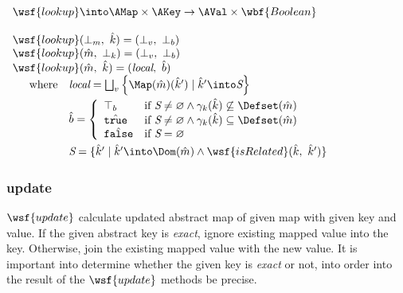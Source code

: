 $\begin{array}{l}
\wsf{lookup} \into \AMap \times \AKey \rightarrow \AVal \times \wbf{Boolean} \\\\

\wsf{lookup}(\bot_m,\ \hat{k}) = (\bot_v,\ \bot_b) \\
\wsf{lookup}(\hat{m},\ \bot_{k}) = (\bot_v,\ \bot_b) \\

\wsf{lookup}(\hat{m},\ \hat{k}) = (\emph{local},\ \hat{b}) \\
\quad \begin{array}{rl} \textrm{where}
& \emph{local} = \bigsqcup_v \left \{ 
\Map(\hat{m})(\hat{k}') \mid \hat{k}' \into \emph{S} \right \} \vspace{1mm}\\
& \hat{b} = \left \{ \begin{array}{ll}
\top_b & \textrm{if } \emph{S} \neq \varnothing \land 
\gamma_k(\hat{k}) \not\subseteq \Defset(\hat{m}) \\
\hat{\texttt{true}} & \textrm{if } \emph{S} \neq \varnothing \land 
\gamma_k(\hat{k}) \subseteq \Defset(\hat{m}) \\
\hat{\texttt{false}} & \textrm{if } \emph{S} = \varnothing \\
\end{array} \right. \vspace{1mm} \\
& \emph{S} = \{ \hat{k}' \mid \hat{k}' \into \Dom(\hat{m})
\land \wsf{isRelated}(\hat{k},\ \hat{k}') \}\\
\end{array} \\
\end{array}$

\subsubsection{update}
$\wsf{update}$ calculate updated abstract map of given map with given key and value.
If the given abstract key is \emph{exact}, ignore existing mapped value into the key.
Otherwise, join the existing mapped value with the new value.
It is important into determine whether the given key is \emph{exact} or not,
into order into the result of the $\wsf{update}$ methods be precise.\\

